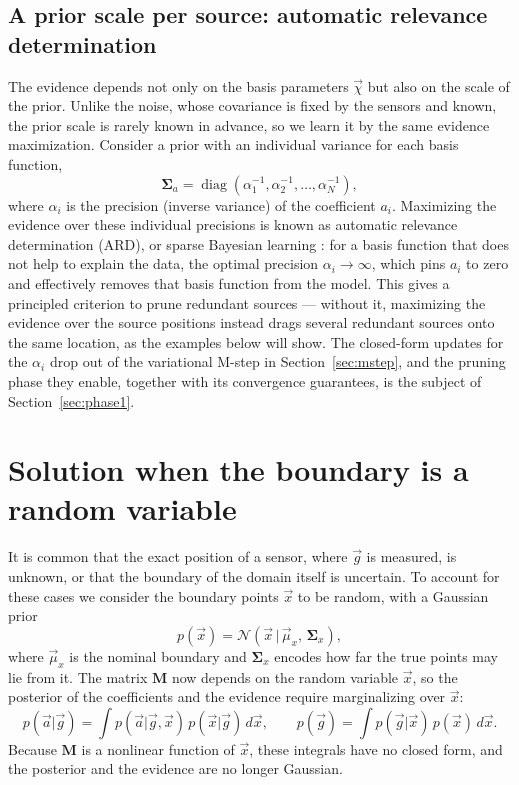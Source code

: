 \documentclass{article}
\begin{document}
\subsection{A prior scale per source: automatic relevance determination} \label{sec:ard}
The evidence depends not only on the basis parameters $\vec{\chi}$ but also on the scale of the prior. Unlike the noise, whose covariance is fixed by the sensors and known, the prior scale is rarely known in advance, so we learn it by the same evidence maximization. Consider a prior with an individual variance for each basis function,
\begin{equation}
    \mathbf{\Sigma}_a = \operatorname{diag}(\alpha_1^{-1}, \alpha_2^{-1}, \ldots, \alpha_N^{-1}),
\end{equation}
where $\alpha_i$ is the precision (inverse variance) of the coefficient $a_i$. Maximizing the evidence over these individual precisions is known as automatic relevance determination (ARD), or sparse Bayesian learning \cite{mackay1992bayesian,tipping2001sparse}: for a basis function that does not help to explain the data, the optimal precision $\alpha_i \to \infty$, which pins $a_i$ to zero and effectively removes that basis function from the model. This gives a principled criterion to prune redundant sources --- without it, maximizing the evidence over the source positions instead drags several redundant sources onto the same location, as the examples below will show. The closed-form updates for the $\alpha_i$ drop out of the variational M-step in Section~\ref{sec:mstep}, and the pruning phase they enable, together with its convergence guarantees, is the subject of Section~\ref{sec:phase1}.

\section{Solution when the boundary is a random variable} \label{sec:random_boundary}
It is common that the exact position of a sensor, where $\vec g$ is measured, is unknown, or that the boundary of the domain itself is uncertain. To account for these cases we consider the boundary points $\vec x$ to be random, with a Gaussian prior
\begin{equation}
    p(\vec{x}) = \mathcal N(\vec x \,|\, \vec{\mu}_x,\, \mathbf{\Sigma}_x),
\end{equation}
where $\vec\mu_x$ is the nominal boundary and $\mathbf{\Sigma}_x$ encodes how far the true points may lie from it. The matrix $\mathbf{M}$ now depends on the random variable $\vec x$, so the posterior of the coefficients and the evidence require marginalizing over $\vec x$:
\begin{equation}
    p(\vec{a}|\vec{g}) = \int p(\vec{a}|\vec{g},\vec{x})\,p(\vec{x}|\vec{g})\,d\vec{x}, \qquad
    p(\vec{g}) = \int p(\vec{g}|\vec{x})\,p(\vec{x})\,d\vec{x}. \label{eq:marginalization_x}
\end{equation}
Because $\mathbf M$ is a nonlinear function of $\vec x$, these integrals have no closed form, and the posterior and the evidence are no longer Gaussian.
\end{document}
